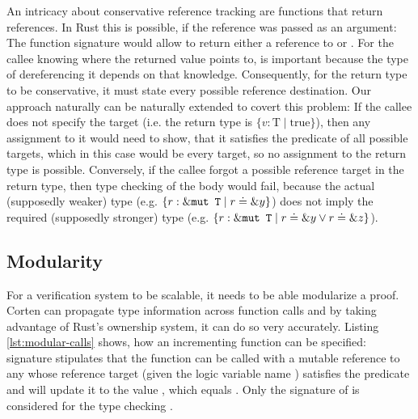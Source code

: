 \documentclass[twoside, english, final]{sdqthesis}
\theoremstyle{definition}
\begin{document}
An intricacy about conservative reference tracking are functions that return references. In Rust this is possible, if the reference was passed as an argument: The function signature  would allow  to return either a reference to  or . For the callee knowing where the returned value points to, is important because the type of dereferencing it depends on that knowledge. 
Consequently, for the return type to be conservative, it must state every possible reference destination.
Our approach naturally can be naturally extended to covert this problem: If the callee does not specify the target (i.e. the return type is $\{ v : \text{T} \mid \text{true}\}$), then any assignment to it would need to show, that it satisfies the predicate of all possible targets, which in this case would be every target, so no assignment to the return type is possible.
Conversely, if the callee forgot a possible reference target in the return type, then type checking of the body would fail, because the actual (supposedly weaker) type (e.g. $\{ r : \&\code{mut T} \mid r \doteq \&y \}$) does not imply the required (supposedly stronger) type (e.g. $\{ r : \&\code{mut T} \mid r \doteq \&y \vee r \doteq \&z \}$).






\label{sec:modularity}\subsection{Modularity}

For a verification system to be scalable, it needs to be able modularize a proof. Corten can propagate type information across function calls and by taking advantage of Rust's ownership system, it can do so very accurately. Listing \ref{lst:modular-calls} shows, how an incrementing function  can be specified:  signature stipulates that the function can be called with a mutable reference to any  whose reference target (given the logic variable name ) satisfies the predicate  and will update it to the value , which equals . Only the signature of  is considered for the type checking . 
\end{document}
